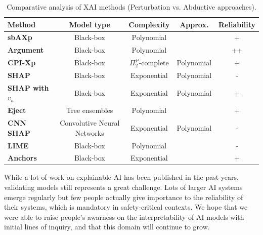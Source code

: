 \begin{table}[ht]
    \centering
    \caption{Comparative analysis of XAI methods (Perturbation vs. Abductive approaches).}
    \label{tab:comparaison_xai}
    \vspace{0.3cm}
    
    
    \small
    \begin{tabularx}{\textwidth}{@{} L C C C C @{}}
        \toprule

        \textbf{Method} & \textbf{Model type} & \textbf{Complexity} & \textbf{Approx.} & \textbf{Reliability} \\

        \midrule

        \textbf{sbAXp} & Black-box & Polynomial & & + \\
        \addlinespace[2pt]
        
        \textbf{Argument} & Black-box & Polynomial & & ++ \\
        \addlinespace[2pt]
        
        \textbf{CPI-Xp} & Black-box & $\Pi^P_2$-complete & Polynomial & + \\

        \midrule
        
        \textbf{SHAP} & Black-box & Exponential & Polynomial & - \\
        \addlinespace[2pt]

        \textbf{SHAP with $v_a$} & Black-box & Exponential & Polynomial & + \\
        \addlinespace[2pt]

        \textbf{Eject} & Tree ensembles & Polynomial & & + \\
        \addlinespace[2pt]

        \textbf{CNN SHAP} & Convolutive Neural Networks & Exponential & Polynomial & - \\

        \midrule
        
        \textbf{LIME} & Black-box & Polynomial & & - \\
        \addlinespace[2pt]
        
        \textbf{Anchors} & Black-box & Exponential & & + \\
        
        \bottomrule
    \end{tabularx}
\end{table}

While a lot of work on explainable AI has been published in the past years, validating models still represents a great challenge. Lots of larger AI systems emerge regularly but few people actually give importance to the reliability of their systems, which is mandatory in safety-critical contexts. We hope that we were able to raise people's awarness on the interpretability of AI models with initial lines of inquiry, and that this domain will continue to grow.